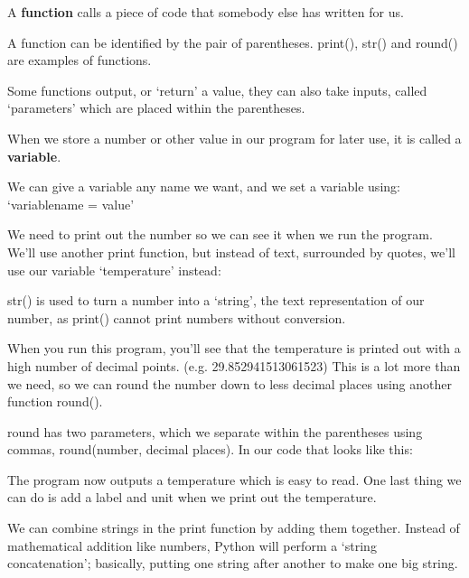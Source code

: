 \documentclass[a4paper, twocolumn, twoside, 12pt]{article}
\newenvironment{aside}
		{
		\begin{mdframed}[
			style=0,%
			leftline=false,
			rightline=false,
			innerbottommargin=2pt,
			innerleftmargin=12pt,
			innerrightmargin=0pt,
			linewidth=0.75pt,
			skipabove=6pt,
			skipbelow=6pt
			]
				\small
				\color{JungleGreen}
				\setlength{\parskip}{2pt}
				\vspace{2pt} %
		}
		{
		\end{mdframed}
		}
\begin{document}
		\begin{aside}
			A \textbf{function} calls a piece of code that somebody else has written for us.
			
			A function can be identified by the pair of parentheses. print(), str() and round() are examples of functions.
			
			Some functions output, or `return' a value, they can also take inputs, called `parameters' which are placed within the parentheses.
		\end{aside}
		\begin{aside}
			When we store a number or other value in our program for later use, it is called a \textbf{variable}.
			
			We can give a variable any name we want, and we set a variable using: `variablename = value'
		\end{aside}
		
		We need to print out the number so we can see it when we run the program. We'll use another print function, but instead of text, surrounded by quotes, we'll use our variable `temperature' instead:
		
		
		
		str() is used to turn a number into a `string', the text representation of our number, as print() cannot print numbers without conversion.
		
		When you run this program, you'll see that the temperature is printed out with a high number of decimal points. (e.g. 29.852941513061523)
		This is a lot more than we need, so we can round the number down to less decimal places using another function round().
		
		round has two parameters, which we separate within the parentheses using commas, round(number, decimal places). In our code that looks like this:
		
		
		
		The program now outputs a temperature which is easy to read.
		One last thing we can do is add a label and unit when we print out the temperature.
		
		We can combine strings in the print function by adding them together.
		Instead of mathematical addition like numbers, Python will perform a `string concatenation'; basically, putting one string after another to make one big string.
		
		
		
\end{document}
